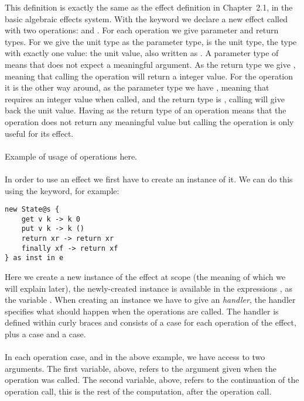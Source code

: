 This definition is exactly the same as the  effect definition in Chapter~2.1, in the basic algebraic effects system.
With the  keyword we declare a new effect called  with two operations:  and .
For each operation we give parameter and return types. For  we give the unit type \ident{()} as the parameter type, \ident{()} is the unit type, the type with exactly one value: the unit value, also written as \ident{()}. A parameter type of \ident{()} means that  does not expect a meaningful argument. As the return type we give , meaning that calling the  operation will return a integer value. For the  operation it is the other way around, as the parameter type we have , meaning that  requires an integer value when called, and the return type is \ident{()}, calling  will give back the unit value. Having \ident{()} as the return type of an operation means that the operation does not return any meaningful value but calling the operation is only useful for its effect.
\\\\
Example of usage of operations here.
\\\\
In order to use an effect we first have to create an instance of it.
We can do this using the  keyword, for example:
\begin{verbatim}
new State@s {
	get v k -> k 0
	put v k -> k ()
	return xr -> return xr
	finally xf -> return xf
} as inst in e
\end{verbatim}
Here we create a new instance of the  effect at scope  (the meaning of which we will explain later), the newly-created instance is available in the expressions , as the variable .
When creating an instance we have to give an \emph{handler}, the handler specifies what should happen when the operations are called.
The handler is defined within curly braces and consists of a case for each operation of the effect, plus a  case and a  case.
\\\\
In each operation case,  and  in the above example, we have access to two arguments.
The first variable,  above, refers to the argument given when the operation was called.
The second variable,  above, refers to the continuation of the operation call, this is the rest of the computation, after the operation call.
